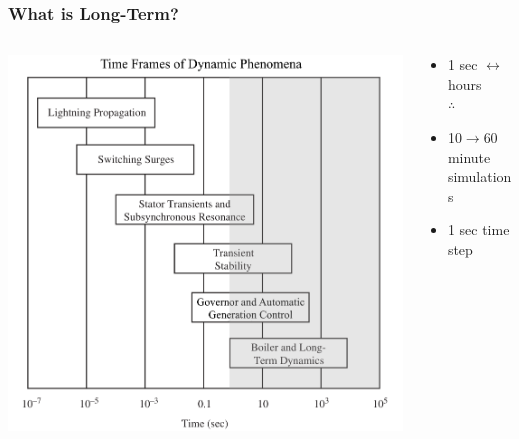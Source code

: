 \documentclass[14pt, unknownkeysallowed]{beamer}
\begin{document}
\begin{frame}
\frametitle{What is Long-Term?}
\begin{columns}
	\begin{column}{0.7\textwidth}
		\begin{center}
			\includegraphics[height=.8\textheight]{timeScalesHL}{\tiny\cite{SauerPaiChow}} 
		\end{center}
	\end{column}
	\begin{column}{0.5\textwidth}
	   \begin{itemize}
			\small
			\item 1 sec $\leftrightarrow$ hours \\
			$\therefore$ 
			\item 10$\rightarrow$60 minute simulations
			\item 1 sec time step
	\end{itemize}
	\end{column}

\end{columns}
\end{frame}

\end{document}
